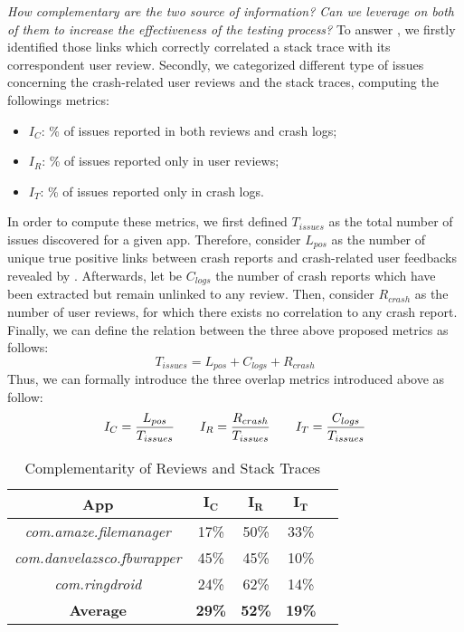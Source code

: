 \vspace{1em}
\smallbreak
{} \textit{How complementary are the two source of information? Can we leverage on both of them to increase the effectiveness of the testing process?}
\smallbreak
To answer , we firstly identified those links which correctly correlated a stack trace with its correspondent user review.  
Secondly, we categorized different type of issues concerning the crash-related user reviews and the stack traces, computing the followings metrics: 
\begin{itemize}
	\item $I_C$: \% of issues reported in both reviews and crash logs;
	
	\item $I_R$: \% of issues reported only in user reviews; 
	
	\item $I_T$: \% of issues reported only in crash logs. 
\end{itemize}
In order to compute these metrics, we first defined $T_{issues}$ as the total number of issues
discovered for a given app.
Therefore, consider $L_{pos}$ as the number of unique true positive links between crash reports and crash-related user feedbacks revealed by \toolname. 
Afterwards, let be $C_{logs}$ the number of crash reports which have been extracted but remain unlinked to any review.
Then, consider $R_{crash}$ as the number of user reviews, for which there exists no correlation to any crash report. 
Finally, we can define the relation between the three above proposed metrics as follows: 
$$T_{issues} = L_{pos} + C_{logs} + R_{crash} $$
%
Thus, we can formally introduce the three overlap metrics introduced above as follow: 
	\begin{equation*}
	I_C = {L_{pos}\over T_{issues}}
	\qquad
	I_R = {R_{crash}\over T_{issues}}
	\qquad
	I_T = {C_{logs}\over T_{issues}}
	\end{equation*}
	


\begin{table}[tb]
	\centering
	\caption{Complementarity of Reviews and Stack Traces}
	\label{tbl: metrics}
	\begin{tabular}{ccccc}
		\toprule
		\textbf{App} & $\mathbf{I_C}$ & $\mathbf{I_R}$ & $\mathbf{I_T}$ \\ 
		\midrule
		\textit{com.amaze.filemanager} & 17\% & 50\% & 33\% \\
		\textit{com.danvelazsco.fbwrapper} & 45\% & 45\% & 10\% \\
		\textit{com.ringdroid} & 24\%	 & 62\% & 14\%\\
		\hline
		\textbf{Average} & \textbf{29\%}& \textbf{52\%}& \textbf{19\%}\\
		\bottomrule
	\end{tabular}
	\vspace{-2.5mm}
\end{table}


